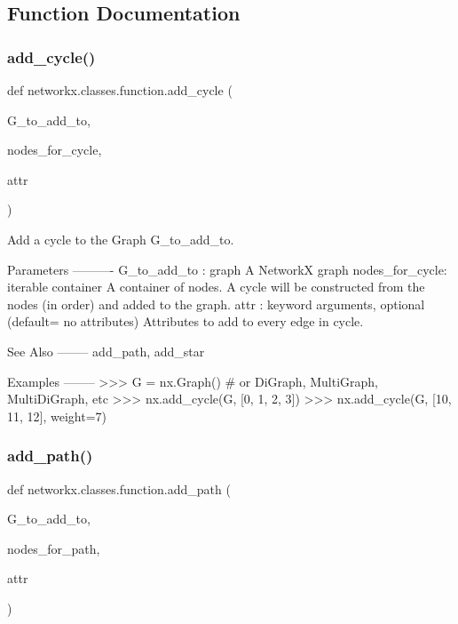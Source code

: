 \subsection{Function Documentation}
\mbox{\label{namespacenetworkx_1_1classes_1_1function_aea8b85f51c5079f3c36d1e2fcdd28fec}} 
\subsubsection{\texorpdfstring{add\+\_\+cycle()}{add\_cycle()}}
{\footnotesize\ttfamily def networkx.\+classes.\+function.\+add\+\_\+cycle (\begin{DoxyParamCaption}\item[{}]{G\+\_\+to\+\_\+add\+\_\+to,  }\item[{}]{nodes\+\_\+for\+\_\+cycle,  }\item[{}]{attr }\end{DoxyParamCaption})}

\begin{DoxyVerb}Add a cycle to the Graph G_to_add_to.

Parameters
----------
G_to_add_to : graph
    A NetworkX graph
nodes_for_cycle: iterable container
    A container of nodes.  A cycle will be constructed from
    the nodes (in order) and added to the graph.
attr : keyword arguments, optional (default= no attributes)
    Attributes to add to every edge in cycle.

See Also
--------
add_path, add_star

Examples
--------
>>> G = nx.Graph()  # or DiGraph, MultiGraph, MultiDiGraph, etc
>>> nx.add_cycle(G, [0, 1, 2, 3])
>>> nx.add_cycle(G, [10, 11, 12], weight=7)
\end{DoxyVerb}
 \mbox{\label{namespacenetworkx_1_1classes_1_1function_a272ff2af873850562af525145f897dda}} 
\subsubsection{\texorpdfstring{add\+\_\+path()}{add\_path()}}
{\footnotesize\ttfamily def networkx.\+classes.\+function.\+add\+\_\+path (\begin{DoxyParamCaption}\item[{}]{G\+\_\+to\+\_\+add\+\_\+to,  }\item[{}]{nodes\+\_\+for\+\_\+path,  }\item[{}]{attr }\end{DoxyParamCaption})}

